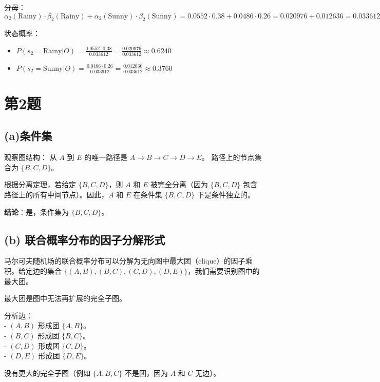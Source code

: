 \documentclass{article}
\begin{document}
分母：
\[
\alpha_2(\text{Rainy}) \cdot \beta_2(\text{Rainy}) + \alpha_2(\text{Sunny}) \cdot \beta_2(\text{Sunny}) = 0.0552 \cdot 0.38 + 0.0486 \cdot 0.26 = 0.020976 + 0.012636 = 0.033612
\]

状态概率：
\begin{itemize}
    \item \( P(s_2 = \text{Rainy} | O) = \frac{0.0552 \cdot 0.38}{0.033612} = \frac{0.020976}{0.033612} \approx 0.6240 \)
    \item \( P(s_2 = \text{Sunny} | O) = \frac{0.0486 \cdot 0.26}{0.033612} = \frac{0.012636}{0.033612} \approx 0.3760 \)
\end{itemize}

\section*{第2题}

\subsection*{(a)条件集}

观察图结构：
从 \( A \) 到 \( E \) 的唯一路径是 \( A \rightarrow B \rightarrow C \rightarrow D \rightarrow E \)。
路径上的节点集合为 \( \{B, C, D\} \)。

根据分离定理，若给定 \( \{B, C, D\} \)，则 \( A \) 和 \( E \) 被完全分离（因为 \( \{B, C, D\} \) 包含路径上的所有中间节点）。因此，\( A \) 和 \( E \) 在条件集 \( \{B, C, D\} \) 下是条件独立的。

\textbf{结论}：是，条件集为 \( \{B, C, D\} \)。

\subsection*{(b) 联合概率分布的因子分解形式}

马尔可夫随机场的联合概率分布可以分解为无向图中最大团（clique）的因子乘积。给定边的集合 \( \{(A,B), (B,C), (C,D), (D,E)\} \)，我们需要识别图中的最大团。

最大团是图中无法再扩展的完全子图。

分析边：\\
  - \( (A,B) \) 形成团 \( \{A, B\} \)。\\
  - \( (B,C) \) 形成团 \( \{B, C\} \)。\\
  - \( (C,D) \) 形成团 \( \{C, D\} \)。\\
  - \( (D,E) \) 形成团 \( \{D, E\} \)。

没有更大的完全子图（例如 \( \{A, B, C\} \) 不是团，因为 \( A \) 和 \( C \) 无边）。
\end{document}
